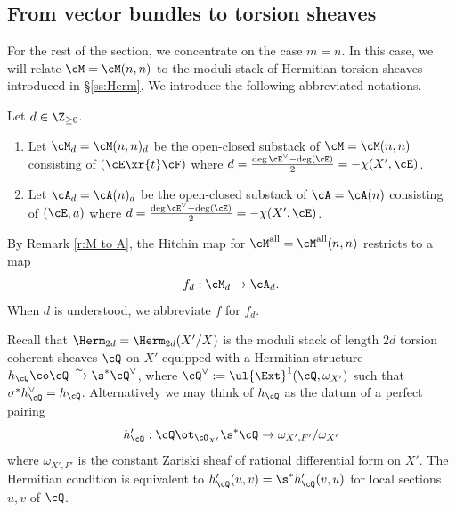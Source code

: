 






\subsection{From vector bundles to torsion sheaves}\label{ss:vb to tor}
For the rest of the section, we concentrate on the case $m=n$. In this case, we will relate $\cM = \cM(n,n)$ to the moduli stack of Hermitian torsion sheaves introduced in \S\ref{ss:Herm}.  We introduce the following abbreviated notations.

\begin{defn}
\notready Let $d\in \Z_{\ge0}$.
\begin{enumerate}
\item Let $\cM_{d} = \cM(n,n)_d$ be the open-closed substack of $\cM = \cM(n,n)$ consisting of $(\cE\xr{t}\cF)$ where $d=\frac{\deg\cE^\vee-\deg(\cE)}{2}=-\chi(X',\cE)$.
\item Let $\cA_{d}  = \cA(n)_d$ be the open-closed substack of $\cA = \cA(n)$ consisting of $(\cE,a)$ where $d=\frac{\deg\cE^\vee-\deg(\cE)}{2}=-\chi(X',\cE)$.
\end{enumerate}
\end{defn}

By Remark \ref{r:M to A}, the Hitchin map for $\cM ^{\rm all}= \cM^{\rm all}(n,n)$ restricts to a map
\begin{equation}
f_{d}: \cM_{d}\to \cA_{d}.
\end{equation}
When $d$ is understood, we abbreviate $f$ for $f_{d}$.


Recall that  $\Herm_{2d}=\Herm_{2d}(X'/X)$ is the moduli stack of length $2d$ torsion coherent sheaves $\cQ$ on $X'$ equipped with a Hermitian structure $h_{\cQ} \co \cQ \xrightarrow{\sim} \s^{*}\cQ^{\vee}$, where $\cQ^{\vee} := \ul{\Ext}^1(\cQ, \omega_{X'})$ such that $\sigma^* h_{\cQ}^{\vee}=h_{\cQ}$.  Alternatively we may think of $h_{\cQ}$ as the datum of a perfect pairing
\begin{equation}
h'_{\cQ}: \cQ\ot_{\cO_{X'}}\s^{*}\cQ\to \omega_{X',F'}/\omega_{X'}
\end{equation}
where $\omega_{X',F'}$ is the constant Zariski sheaf of rational differential form on $X'$. The Hermitian condition is equivalent to $h'_{\cQ}(u,v)=\s^{*}h'_{\cQ}(v,u)$ for local sections $u,v$ of $\cQ$.


